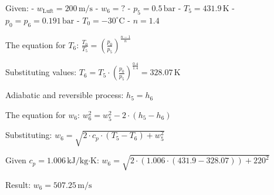 Given:  
- \( w_{\text{Luft}} = 200 \, \text{m/s} \)  
- \( w_6 = ? \)  
- \( p_5 = 0.5 \, \text{bar} \)  
- \( T_5 = 431.9 \, \text{K} \)  
- \( p_0 = p_6 = 0.191 \, \text{bar} \)  
- \( T_0 = -30^\circ \text{C} \)  
- \( n = 1.4 \)  

The equation for \( T_6 \):  
\( \frac{T_0}{T_5} = \left( \frac{p_0}{p_5} \right)^{\frac{n-1}{n}} \)  

Substituting values:  
\( T_6 = T_5 \cdot \left( \frac{p_0}{p_5} \right)^{\frac{0.4}{1.4}} = 328.07 \, \text{K} \)  

Adiabatic and reversible process:  
\( h_5 = h_6 \)  

The equation for \( w_6 \):  
\( w_6^2 = w_5^2 - 2 \cdot \left( h_5 - h_6 \right) \)  

Substituting:  
\( w_6 = \sqrt{2 \cdot c_p \cdot (T_5 - T_6) + w_5^2} \)  

Given \( c_p = 1.006 \, \text{kJ/kg·K} \):  
\( w_6 = \sqrt{2 \cdot (1.006 \cdot (431.9 - 328.07)) + 220^2} \)  

Result:  
\( w_6 = 507.25 \, \text{m/s} \)